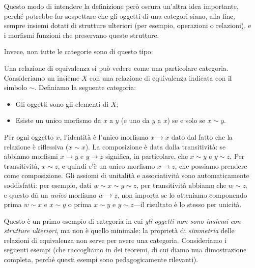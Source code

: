 Questo modo di intendere la definizione però oscura un'altra idea importante, perché potrebbe far sospettare che gli oggetti di una categori siano, alla fine, sempre insiemi dotati di strutture ulteriori (per esempio, operazioni o relazioni), e i morfismi funzioni che preservano queste strutture.

Invece, non tutte le categorie sono di questo tipo:
\begin{example}
 Una relazione di equivalenza si può vedere come una particolare categoria. Consideriamo un insieme $X$ con una relazione di equivalenza indicata con il simbolo $\sim$.
 Definiamo la seguente categoria:
 \begin{itemize}
  \item Gli oggetti sono gli elementi di $X$;
  \item Esiste un unico morfismo da $x$ a $y$ (e uno da $y$ a $x$) se e solo se $x\sim y$.
 \end{itemize}
 Per ogni oggetto $x$, l'identità è l'unico morfismo $x\to x$ dato dal fatto che la relazione è riflessiva ($x\sim x$).
 La composizione è data dalla transitività: se abbiamo morfismi $x\to y$ e $y\to z$ significa, in particolare, che $x\sim y$ e $y\sim z$. Per transitività, $x\sim z$, e quindi c'è un unico morfismo $x\to z$, che possiamo prendere come composizione.
 Gli assiomi di unitalità e associatività sono automaticamente soddisfatti: per esempio, dati $w\sim x\sim y\sim z$, per transitività abbiamo che $w\sim z$, e questo dà un \emph{unico} morfismo $w\to z$, non importa se lo otteniamo componendo prima $w\sim x$ e $x\sim y$ o prima $x\sim y$ e $y\sim z$---il risultato è lo stesso per unicità.
\end{example}
Questo è un primo esempio di categoria in cui \emph{gli oggetti non sono insiemi con strutture ulteriori}, ma non è quello minimale: la proprietà di \emph{simmetria} delle relazioni di equivalenza non serve per avere una categoria. Consideriamo i seguenti esempi (che raccogliamo in dei teoremi, di cui diamo una dimostrazione completa, perché questi esempi sono pedagogicamente rilevanti).
\begin{theorem}\label{pos_sonocat}
\end{theorem}
\begin{theorem}
\end{theorem}
